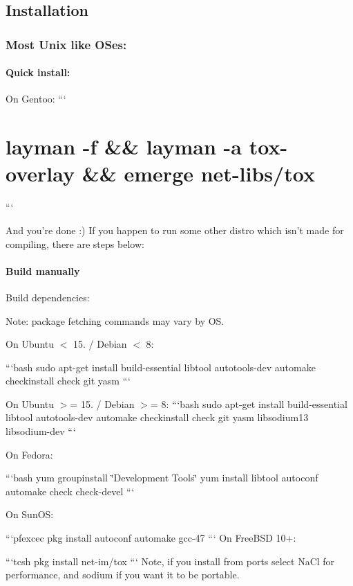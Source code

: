 \label{_installation}%
 \subsection*{Installation}

\label{_unix}%
 \subsubsection*{Most Unix like O\+Ses\+:}

\paragraph*{Quick install\+:}

On Gentoo\+: ``` \section*{layman -\/f \&\& layman -\/a tox-\/overlay \&\& emerge net-\/libs/tox}

```

And you're done {\ttfamily \+:)} If you happen to run some other distro which isn't made for compiling, there are steps below\+:

\paragraph*{Build manually}

Build dependencies\+:

Note\+: package fetching commands may vary by O\+S.

On Ubuntu {\ttfamily $<$ 15.} / Debian {\ttfamily $<$ 8}\+:

```bash sudo apt-\/get install build-\/essential libtool autotools-\/dev automake checkinstall check git yasm ```

On Ubuntu {\ttfamily $>$= 15.} / Debian {\ttfamily $>$= 8}\+: ```bash sudo apt-\/get install build-\/essential libtool autotools-\/dev automake checkinstall check git yasm libsodium13 libsodium-\/dev ```

On Fedora\+:

```bash yum groupinstall \char`\"{}\+Development Tools\char`\"{} yum install libtool autoconf automake check check-\/devel ```

On Sun\+O\+S\+:

```pfexcec pkg install autoconf automake gcc-\/47 ``` On Free\+B\+S\+D 10+\+:

```tcsh pkg install net-\/im/tox ``` Note, if you install from ports select Na\+Cl for performance, and sodium if you want it to be portable.

